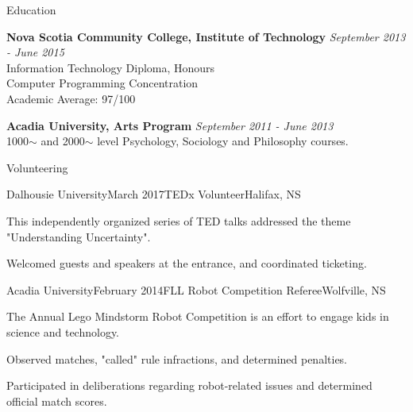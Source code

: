 \documentclass{resume} %
\begin{document}
\begin{rSection}{Education}

{\bf Nova Scotia Community College, Institute of Technology} \hfill {\em September 2013 - June 2015} \\ 
Information Technology Diploma, Honours \\
Computer Programming Concentration \smallskip \\
Academic Average: 97/100

{\bf Acadia University, Arts Program} \hfill {\em September 2011 - June 2013} \\ 
1000$\sim$ and 2000$\sim$ level Psychology, Sociology and Philosophy courses.\\

\end{rSection}



\begin{rSection}{Volunteering}


\begin{rSubsection}{Dalhousie University}{March 2017}{TEDx Volunteer}{Halifax, NS}

\item[] This independently organized series of TED talks addressed the theme "Understanding Uncertainty".\smallskip


\item Welcomed guests and speakers at the entrance, and coordinated ticketing.
\end{rSubsection}

\begin{rSubsection}{Acadia University}{February 2014}{FLL Robot Competition Referee}{Wolfville, NS}

\item[] The Annual Lego Mindstorm Robot Competition is an effort to engage kids in science and technology.\smallskip

\item Observed matches, "called" rule infractions, and determined penalties. 
\item Participated in deliberations regarding robot-related issues and determined official match scores.
\end{rSubsection}

\end{rSection}
\end{document}
